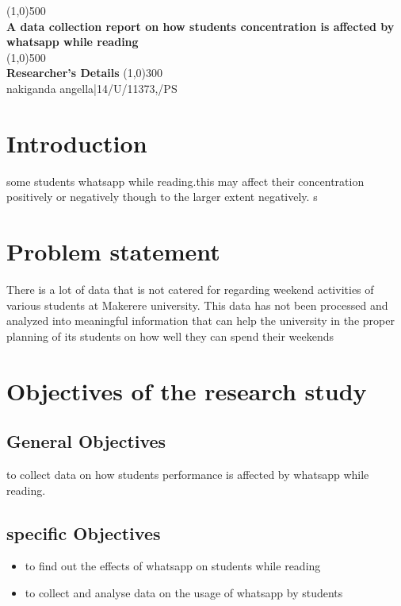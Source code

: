 \documentclass[12pt,a4paper]{article}
\begin{document}
\begin{titlepage}
    \begin{center}
\line(1,0){500}\\
\huge{\bfseries A data collection report on how students concentration is affected by whatsapp while reading\\}
\line(1,0){500}\\
[0.25in]
\huge{\bfseries Researcher's Details}
\line(1,0){300}\\

nakiganda angella|14/U/11373,/PS\\

\end{center}
\end{titlepage}
\author{GROUP 122}
\section{Introduction}
some students whatsapp while reading.this may affect their concentration positively or negatively though to the larger extent negatively.
s\section{Problem statement}
There is a lot of data that is not catered for regarding weekend activities of various students at Makerere university. This data has not been processed and analyzed into meaningful information that can help the university in the proper planning of its students on how well they can spend their weekends

\section{Objectives of the research study}
\subsection{General Objectives}
to collect data on how students performance is affected by whatsapp while reading.
\subsection{specific Objectives}
\begin{itemize}
\item to find out the effects of whatsapp on students while reading
\item to collect and analyse data on the usage of whatsapp  by students
\end{itemize}
\end{document}
